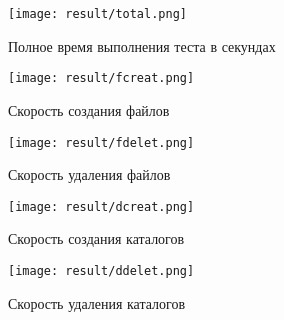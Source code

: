 \begin{figure}[H]
  \centering
  \texttt{[image: result/total.png]}
  \caption{Полное время выполнения теста в секундах}
  \label{pic:total}
\end{figure}

\begin{figure}[H]
  \centering
  \texttt{[image: result/fcreat.png]}
  \caption{Скорость создания файлов}
  \label{pic:fcreat}
\end{figure}

\begin{figure}[H]
  \centering
  \texttt{[image: result/fdelet.png]}
  \caption{Скорость удаления файлов}
  \label{pic:fdelet}
\end{figure}

\begin{figure}[H]
  \centering
  \texttt{[image: result/dcreat.png]}
  \caption{Скорость создания каталогов}
  \label{pic:fdelet}
\end{figure}

\begin{figure}[H]
  \centering
  \texttt{[image: result/ddelet.png]}
  \caption{Скорость удаления каталогов}
  \label{pic:fdelet}
\end{figure}
